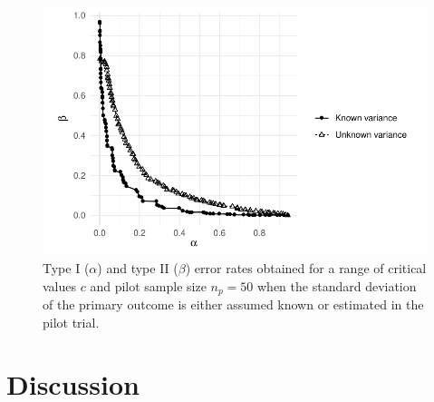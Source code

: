 \documentclass[AMA,STIX1COL]{WileyNJD-v2}
\begin{document}
\begin{figure}
\centering
\includegraphics[scale=0.8]{./Figures/var_ocs.pdf}
\caption{Type I ($\alpha$) and type II ($\beta$) error rates obtained for a range of critical values $c$ and pilot sample size $n_p = 50$ when the standard deviation of the primary outcome is either assumed known or estimated in the pilot trial.}
\label{fig:unknown_var}
\end{figure}

\section{Discussion}\label{sec:discussion}

\end{document}

